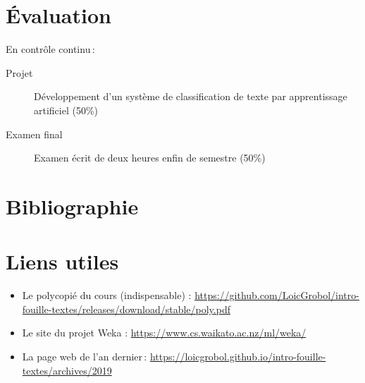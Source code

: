 \documentclass[a4paper, 11pt]{article}
\begin{document}
\section*{Évaluation}
En contrôle continu :

\begin{description}
    \item[Projet] Développement d'un système de classification de texte par apprentissage artificiel (50\%)
    \item[Examen final] Examen écrit de deux heures enfin de semestre (50\%)
\end{description}

\section*{Bibliographie}
\printbibliography[heading=none]

\section*{Liens utiles}
\begin{itemize}
    \item Le polycopié du cours (indispensable) :  \url{https://github.com/LoicGrobol/intro-fouille-textes/releases/download/stable/poly.pdf}
    \item Le site du projet Weka : \url{https://www.cs.waikato.ac.nz/ml/weka/}
    \item La page web de l'an dernier : \url{https://loicgrobol.github.io/intro-fouille-textes/archives/2019}
\end{itemize}
\end{document}
